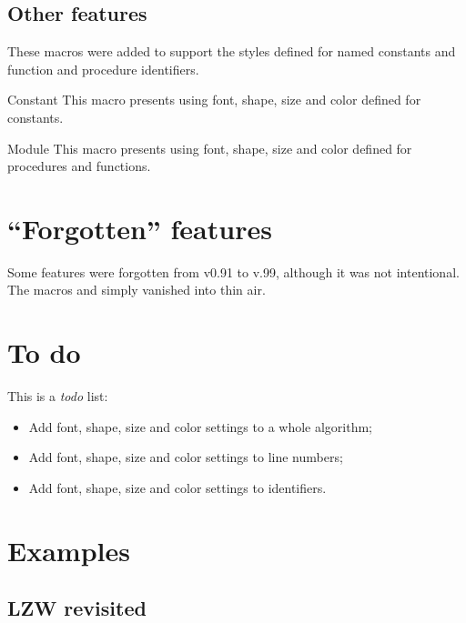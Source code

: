 \documentclass[a4paper, 11pt]{article}
\begin{document}
\subsection{Other features}

%
These macros were added to support the styles defined for named constants and function and procedure identifiers.

\begin{Macrodef}{Constant}{}{}
    This macro presents  using font, shape, size and color defined for constants.
\end{Macrodef}

\begin{Macrodef}{Module}{}{}
    This macro presents  using font, shape, size and color defined for procedures and functions.
\end{Macrodef}


\section{``Forgotten'' features}

%
Some features were forgotten from v0.91 to v.99, although it was not intentional. The macros  and  simply vanished into thin air.


\section{To do}
This is a \textit{todo} list:
\begin{itemize}
    \item Add font, shape, size and color settings to a whole algorithm;
    \item Add font, shape, size and color settings to line numbers;
    \item Add font, shape, size and color settings to identifiers.
\end{itemize}


\section{Examples}

\subsection{LZW revisited}
\begingroup
\begin{PDListing}
\end{PDListing}
\end{document}
